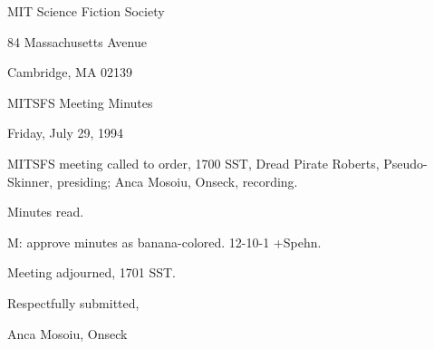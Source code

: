 \documentclass[12pt]{article}
\begin{document}
\begin{center}

MIT Science Fiction Society 

84 Massachusetts Avenue

Cambridge, MA 02139

\vspace{12pt}

MITSFS Meeting Minutes 

Friday, July 29, 1994

\end{center}
 
\vspace{18pt}

\setlength{\parskip}{6pt}

\noindent
MITSFS meeting called to order, 1700 SST,
Dread Pirate Roberts, Pseudo-Skinner, presiding; Anca Mosoiu, Onseck, recording.

Minutes read.

M: approve minutes as banana-colored. 12-10-1 +Spehn.

\vspace{12pt}

\noindent
Meeting adjourned, 1701 SST.

\vspace{18pt}

\centerline{Respectfully submitted,}
\centerline{Anca Mosoiu, Onseck}
\end{document}
